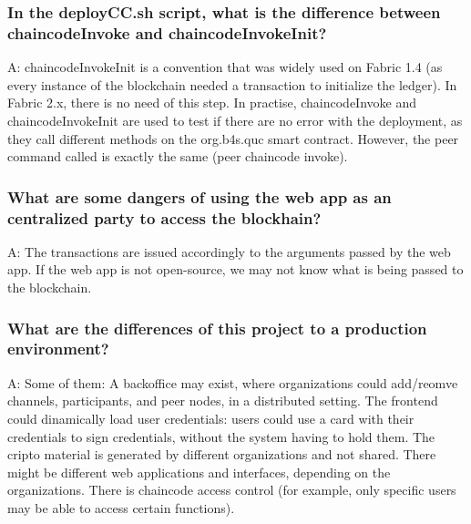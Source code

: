 \documentclass[12pt,a4paper]{article}
\begin{document}
\subsubsection*{In the deployCC.sh script, what is the difference between chaincodeInvoke and chaincodeInvokeInit?}

A: chaincodeInvokeInit is a convention that was widely used on Fabric 1.4 (as every instance of the blockchain needed a transaction to initialize the ledger). In Fabric 2.x, there is no need of this step. In practise, chaincodeInvoke and chaincodeInvokeInit are used to test if there are no error with the deployment, as they call different methods on the org.b4s.quc smart contract. However, the peer command called is exactly the same (peer chaincode invoke). 

\subsubsection*{What are some dangers of using the web app as an centralized party to access the blockhain?}
A: The transactions are issued accordingly to the arguments passed by the web app. If the web app is not open-source, we may not know what is being passed to the blockchain.


\subsubsection*{What are the differences of this project to a production environment?}
A: Some of them: A backoffice may exist, where organizations could add/reomve channels, participants, and peer nodes, in a distributed setting. The frontend could dinamically load user credentials: users could use a card with their credentials to sign credentials, without the system having to hold them. The cripto material is generated by different organizations and not shared. There might be different web applications and interfaces, depending on the organizations. There is chaincode access control (for example, only specific users may be able to access certain functions).


\end{document}
